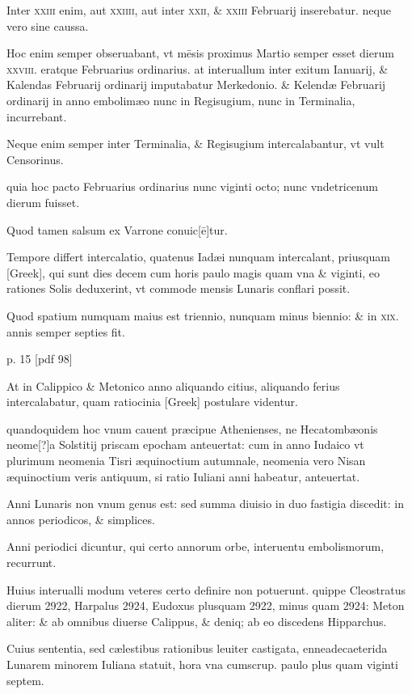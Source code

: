 Inter \textsc{xxiii} enim, aut \textsc{xxiiii},
aut inter \textsc{xxii}, \& \textsc{xxiii} Februarij inserebatur.
neque vero sine caussa.

Hoc enim semper obseruabant, vt mēsis proximus Martio semper esset
dierum \textsc{xxviii}.
eratque Februarius ordinarius. at interuallum inter exitum
Ianuarij, \& Kalendas Februarij ordinarij imputabatur Merkedonio.
\& Kelendæ Februarij ordinarij in anno embolimæo nunc in Regisugium,
nunc in Terminalia, incurrebant.

Neque enim semper inter
Terminalia, \& Regisugium intercalabantur, vt vult Censorinus.

quia hoc pacto Februarius ordinarius nunc viginti octo; nunc vndetricenum
dierum fuisset.

Quod tamen salsum ex Varrone conuic[ē]tur.

Tempore differt intercalatio, quatenus Iadæi nunquam intercalant,
priusquam \textgreek{[Greek]}, qui sunt dies decem cum horis paulo
magis quam vna \& viginti, eo rationes Solis deduxerint, vt commode
mensis Lunaris conflari possit.

Quod spatium numquam maius est
triennio, nunquam minus biennio: \& in \textsc{xix}. annis semper septies fit.



p. 15 [pdf 98]


At in Calippico \& Metonico anno aliquando citius, aliquando ferius
intercalabatur, quam ratiocinia \textgreek{[Greek]} postulare videntur.

quandoquidem hoc vnum cauent præcipue Athenienses, ne Hecatombæonis
neome[?]a Solstitij priscam epocham anteuertat: cum in
anno Iudaico vt plurimum neomenia Tisri æquinoctium autumnale,
neomenia vero Nisan æquinoctium veris antiquum, si ratio Iuliani
anni habeatur, anteuertat.

Anni Lunaris non vnum genus est: sed
summa diuisio in duo fastigia discedit: in annos periodicos, \& simplices.

Anni periodici dicuntur, qui certo annorum orbe, interuentu
embolismorum, recurrunt.

Huius interualli modum veteres certo
definire non potuerunt. quippe Cleostratus dierum 2922, Harpalus
2924, Eudoxus plusquam 2922, minus quam 2924: Meton aliter:
\& ab omnibus diuerse Calippus, \& deniq; ab eo discedens Hipparchus.

Cuius sententia, sed cælestibus rationibus leuiter castigata, enneadecaeterida
Lunarem minorem Iuliana statuit, hora vna cumscrup. paulo
plus quam viginti septem.

